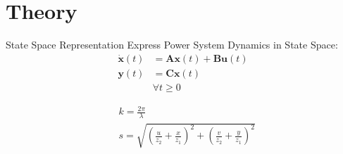 \section[Theory]{Theory}
\label{sec:lasso_theory}

\begin{frame}[fragile]{State Space Representation}
	Express Power System Dynamics in State Space:
	\begin{equation}
		\label{eq:ssr}
		\begin{align}
			\dot{\textbf{x}}(t) &= 
			 \textbf{A}\textbf{x}(t)
			+ \textbf{B}\textbf{u}(t)\\
			\textbf{y}(t) &= 
			 \textbf{C}\textbf{x}(t)\\  
			& \forall t\geq0	
		\end{align}
	\end{equation}
	
	\begin{align*}
		& k=\frac{2 \pi }{\lambda }                                                                      \\
		& s=\sqrt{\left(\frac{u}{z_2}+\frac{x}{z_1}\right)^2+\left(\frac{v}{z_2}+\frac{y}{z_1}\right)^2} 
	\end{align*}
\end{frame}